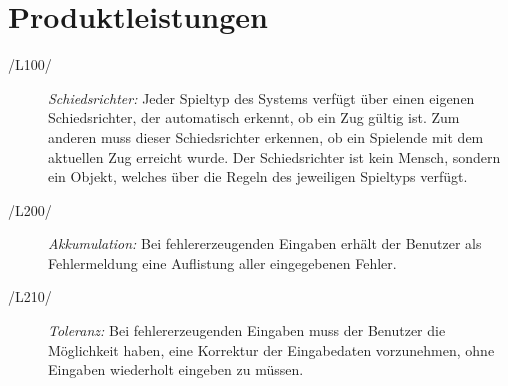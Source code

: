\section{Produktleistungen}


\begin{description}
  \item[/L100/]
    \textit{Schiedsrichter:}
    Jeder Spieltyp des Systems verfügt über einen eigenen Schiedsrichter, der automatisch erkennt, ob ein Zug gültig ist.
    Zum anderen muss dieser Schiedsrichter erkennen, ob ein Spielende mit dem aktuellen Zug erreicht wurde.
    Der Schiedsrichter ist kein Mensch, sondern ein Objekt, welches über die Regeln des jeweiligen Spieltyps verfügt.
  \item[/L200/]
    \textit{Akkumulation:}
    Bei fehlererzeugenden Eingaben erhält der Benutzer als Fehlermeldung eine Auflistung aller eingegebenen Fehler.
  \item[/L210/]
    \textit{Toleranz:}
    Bei fehlererzeugenden Eingaben muss der Benutzer die Möglichkeit haben, eine Korrektur der Eingabedaten vorzunehmen,
    ohne Eingaben wiederholt eingeben zu müssen.
\end{description}

